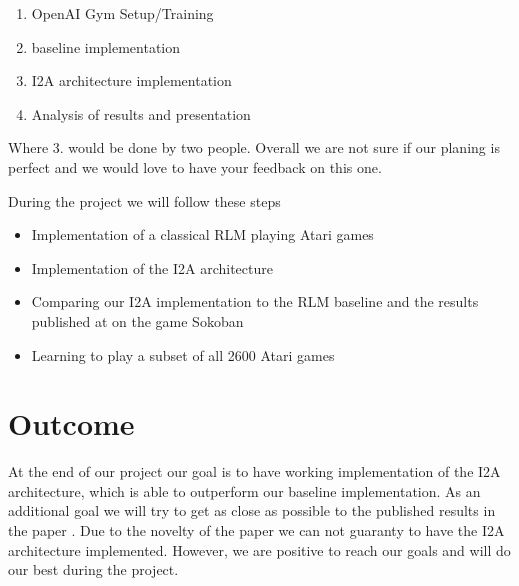 \documentclass[10pt,twocolumn,letterpaper]{article}
\begin{document}
    \begin{enumerate}
    	\item OpenAI Gym Setup/Training
    	\item baseline implementation
    	\item I2A architecture implementation
    	\item Analysis of results and presentation 
    \end{enumerate}
    	
    	
  	 Where 3. would be done by two people. Overall we are not sure if our planing is perfect and we would love to have your feedback on this one.
   
   	During the project we will follow these steps
    \begin{itemize}
        \item Implementation of a classical RLM playing Atari games
        \item Implementation of the I2A architecture
        \item Comparing our I2A implementation to the RLM baseline and the results published at \cite{NIPS2017_7152} on the game Sokoban
        \item Learning to play a subset of all 2600 Atari games
    \end{itemize}

\section{Outcome}
    At the end of our project our goal is to have working implementation of the I2A architecture, which is able to outperform our baseline implementation. As an additional goal we will try to get as close as possible to the published results in the paper \cite{NIPS2017_7152}. Due to the novelty of the paper we can not guaranty to have the I2A architecture implemented. However, we are positive to reach our goals and will do our best during the project.

{\small


}
\end{document}

